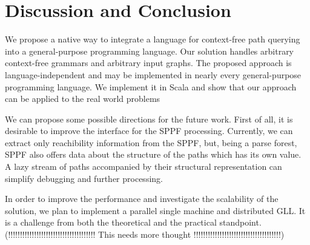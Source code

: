 \section{Discussion and Conclusion}
\label{sec:conclusion}

We propose a native way to integrate a language for context-free path querying into a general-purpose programming language.
Our solution handles arbitrary context-free grammars and arbitrary input graphs.
The proposed approach is language-independent and may be implemented in nearly every general-purpose programming language.
We implement it in Scala and show that our approach can be applied to the real world problems


We can propose some possible directions for the future work.
First of all, it is desirable to improve the interface for the SPPF processing. 
Currently, we can extract only reachibility information from the SPPF, but, being a parse forest, SPPF also offers data about the structure of the paths which has its own value.
A lazy stream of paths accompanied by their structural representation can simplify debugging and further processing.


In order to improve the performance and investigate the scalability of the solution, we plan to implement a parallel single machine and distributed GLL. 
It is a challenge from both the theoretical and the practical standpoint. (!!!!!!!!!!!!!!!!!!!!!!!!!!!!!!!!!!!!! This needs more thought !!!!!!!!!!!!!!!!!!!!!!!!!!!!!!!!!!!!!)


